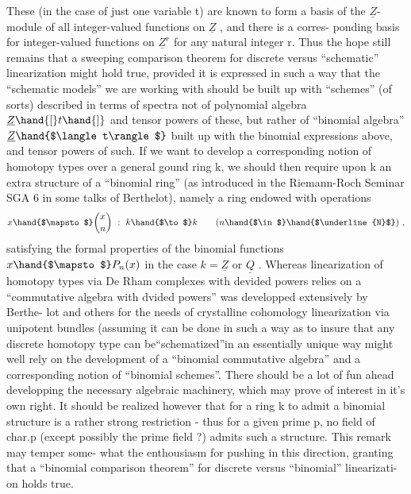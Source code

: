 These (in the case of just one variable t) are known to form a basis of
the $\underline{Z}$-module of all integer-valued functions on $\underline{Z}$ ,  and there is a corres-%
ponding basis for integer-valued functions on $\underline{Z}^r$\hand{,} for any natural integer
r.  Thus the hope still remains that a sweeping comparison theorem for
discrete versus ``schematic''  linearization might hold true,
provided it is expressed in such a way that the ``schematic models'' we are
working with should be built up with ``schemes'' (of sorts) described in
terms of spectra not of polynomial algebra  $\underline{Z}\hand{[}t\hand{]}$ and tensor powers of
these,  but rather of  ``binomial algebra''  $\underline{Z}\hand{$\langle t\rangle$}$ built up with the binomial
expressions above,  and tensor powers  of such.  If we want to develop a
corresponding notion of homotopy types over a general gound ring k,  we
should then require upon k an extra structure of a ``binomial ring'' (as
introduced in the Riemann-Roch Seminar SGA 6 in some talks of Berthelot),
namely a ring endowed with operations
\[ x \hand{$\mapsto$} \binom{x}{n} \ : \ k \hand{$\to$} k \qquad (n \hand{$\in$} \hand{$\underline{N}$}) \ , \]
satisfying the formal properties of the binomial functions  $x \hand{$\mapsto$} P_n(x)$
in the case $k=\underline{Z}$ or $\underline{Q}$ .  Whereas linearization of homotopy types via De
Rham complexes with devided powers relies on a ``commutative algebra with
dvided powers''   was developped extensively by Berthe-%
lot and others for the needs of crystalline cohomology\hand{)}\hand{,}  linearization via
unipotent bundles (assuming it can be done in such a way as to insure that
any discrete homotopy type can be``schematized''in an essentially unique way\hand{)}
might well rely on the development of a ``binomial commutative algebra''
and a corresponding notion of ``binomial schemes''.  There should be a lot
of fun ahead developping the necessary algebraic machinery,  which may
prove of interest in it's own right.  It should be realized however that 
for a ring k to admit a binomial structure is a rather strong restriction
  -  thus for a given prime p,  no field of char.p (except possibly
the prime field ?) admits such a structure.  This remark may temper some-%
what the enthousiasm for pushing in this direction,  granting that a
``binomial comparison theorem'' for discrete versus ``binomial'' linearizati-%
on holds true.


